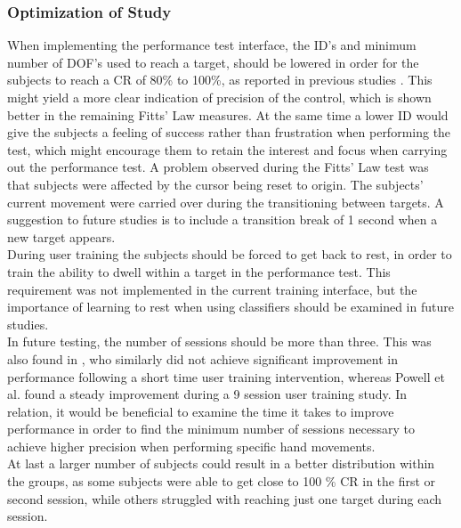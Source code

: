 \subsubsection{Optimization of Study}
When implementing the performance test interface, the ID's and minimum number of DOF's used to reach a target, should be lowered in order for the subjects to reach a CR of 80\% to 100\%, as reported in previous studies \cite{Scheme2013, Scheme2013a}. This might yield a more clear indication of precision of the control, which is shown better in the remaining Fitts' Law measures. At the same time a lower ID would give the subjects a feeling of success rather than frustration when performing the test, which might encourage them to retain the interest and focus when carrying out the performance test.
A problem observed during the Fitts' Law test was that subjects were affected by the cursor being reset to origin. The subjects' current movement were carried over during the transitioning between targets. A suggestion to future studies is to include a transition break of 1 second when a new target appears. \\
During user training the subjects should be forced to get back to rest, in order to train the ability to dwell within a target in the performance test. This requirement was not implemented in the current training interface, but the importance of learning to rest when using classifiers should be examined in future studies.\\
In future testing, the number of sessions should be more than three. This was also found in \cite{Pan2017}, who similarly did not achieve significant improvement in performance following a short time user training intervention, whereas Powell et al. \cite{Powell2014} found a steady improvement during a 9 session user training study. In relation, it would be beneficial to examine the time it takes to improve performance in order to find the minimum number of sessions necessary to achieve higher precision when performing specific hand movements. \\
At last a larger number of subjects could result in a better distribution within the groups, as some subjects were able to get close to 100 \% CR in the first or second session, while others struggled with reaching just one target during each session. 
